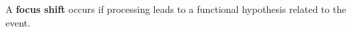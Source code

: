 \begin{defn}\label{def:interest}
  \hypertarget{def:interest}{} A \textbf{focus shift} occurs if processing leads to a functional hypothesis related to the event.
\end{defn}


                                         
